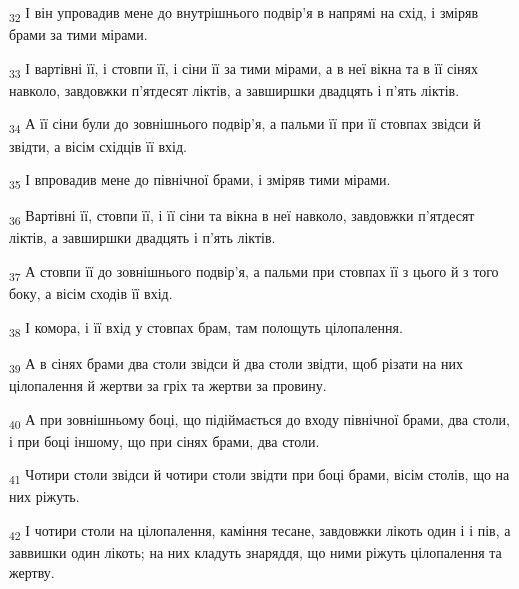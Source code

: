 \begin{tcolorbox}
\textsubscript{32} І він упровадив мене до внутрішнього подвір'я в напрямі на схід, і зміряв брами за тими мірами.
\end{tcolorbox}
\begin{tcolorbox}
\textsubscript{33} І вартівні її, і стовпи її, і сіни її за тими мірами, а в неї вікна та в її сінях навколо, завдовжки п'ятдесят ліктів, а завширшки двадцять і п'ять ліктів.
\end{tcolorbox}
\begin{tcolorbox}
\textsubscript{34} А її сіни були до зовнішнього подвір'я, а пальми її при її стовпах звідси й звідти, а вісім східців її вхід.
\end{tcolorbox}
\begin{tcolorbox}
\textsubscript{35} І впровадив мене до північної брами, і зміряв тими мірами.
\end{tcolorbox}
\begin{tcolorbox}
\textsubscript{36} Вартівні її, стовпи її, і її сіни та вікна в неї навколо, завдовжки п'ятдесят ліктів, а завширшки двадцять і п'ять ліктів.
\end{tcolorbox}
\begin{tcolorbox}
\textsubscript{37} А стовпи її до зовнішнього подвір'я, а пальми при стовпах її з цього й з того боку, а вісім сходів її вхід.
\end{tcolorbox}
\begin{tcolorbox}
\textsubscript{38} І комора, і її вхід у стовпах брам, там полощуть цілопалення.
\end{tcolorbox}
\begin{tcolorbox}
\textsubscript{39} А в сінях брами два столи звідси й два столи звідти, щоб різати на них цілопалення й жертви за гріх та жертви за провину.
\end{tcolorbox}
\begin{tcolorbox}
\textsubscript{40} А при зовнішньому боці, що підіймається до входу північної брами, два столи, і при боці іншому, що при сінях брами, два столи.
\end{tcolorbox}
\begin{tcolorbox}
\textsubscript{41} Чотири столи звідси й чотири столи звідти при боці брами, вісім столів, що на них ріжуть.
\end{tcolorbox}
\begin{tcolorbox}
\textsubscript{42} І чотири столи на цілопалення, каміння тесане, завдовжки лікоть один і і пів, а заввишки один лікоть; на них кладуть знаряддя, що ними ріжуть цілопалення та жертву.
\end{tcolorbox}
